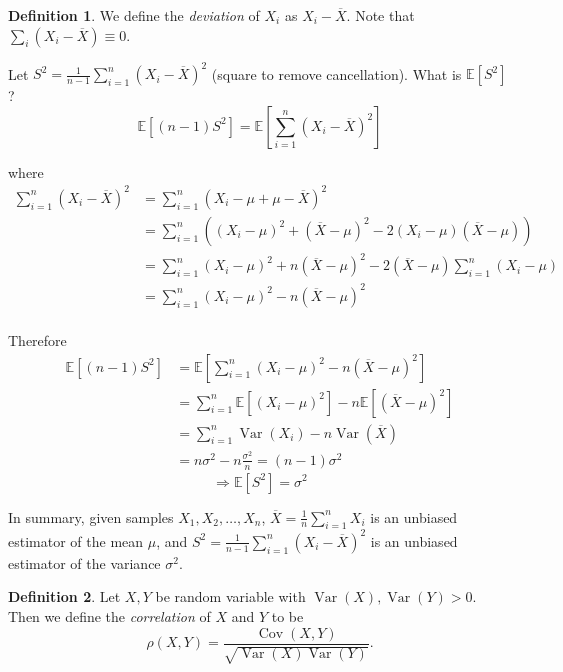 \documentclass[a4paper,11pt]{amsbook}
\theoremstyle{definition}
\newtheorem{definition}{\hspace{-2em} \color{darkblue} Definition}[chapter]
\theoremstyle{remark}
\newcommand{\E}{\mathbb{E}}
\DeclareMathOperator\Var{Var}
\DeclareMathOperator\Cov{Cov}
\newcommand\0{\varnothing}
\begin{document}
\begin{definition}
    We define the \emph{deviation} of $X_i$ as $X_i-\overline{X}.$
    Note that $\sum_i(X_i-\overline{X})\equiv0$.
\end{definition}

Let $S^2=\frac{1}{n-1}\sum_{i=1}^n(X_i-\overline{X})^2$ (square to remove cancellation).
What is $\E[S^2]$?
$$\E[(n-1)S^2]=\E\left[\sum_{i=1}^n(X_i-\overline{X})^2\right]$$

where \begin{align*}
    \sum_{i=1}^n(X_i-\overline{X})^2&=\sum_{i=1}^n(X_i-\mu+\mu-\overline{X})^2 \\
    &=\sum_{i=1}^n\left((X_i-\mu)^2+(\overline{X}-\mu)^2-2(X_i-\mu)(\overline{X}-\mu)\right) \\
    &=\sum_{i=1}^n(X_i-\mu)^2+n(\overline{X}-\mu)^2-2(\overline{X}-\mu)\sum_{i=1}^n(X_i-\mu) \\
    &=\sum_{i=1}^n(X_i-\mu)^2-n(\overline{X}-\mu)^2 \\
\end{align*}

Therefore \begin{align*}
    \E[(n-1)S^2]&=\E\left[\sum_{i=1}^n(X_i-\mu)^2-n(\overline{X}-\mu)^2\right] \\
    &=\sum_{i=1}^n\E[(X_i-\mu)^2]-n\E[(\overline{X}-\mu)^2] \tag{LoE} \\
    &=\sum_{i=1}^n\Var(X_i)-n\Var(\overline{X}) \\
    &=n\sigma^2-n\frac{\sigma^2}{n}=(n-1)\sigma^2
\end{align*}
$$\Rightarrow\E[S^2]=\sigma^2$$

In summary, given samples $X_1,X_2,\ldots,X_n$,
$\overline{X}=\frac{1}{n}\sum_{i=1}^nX_i$ is an unbiased estimator of the mean $\mu$, 
and $S^2=\frac{1}{n-1}\sum_{i=1}^n(X_i-\overline{X})^2$ is an unbiased estimator of the variance $\sigma^2$.

\begin{definition}
    Let $X,Y$ be random variable with $\Var(X),\Var(Y)>0$.
    Then we define the \emph{correlation} of $X$ and $Y$ to be
    $$\rho(X,Y)=\frac{\Cov(X,Y)}{\sqrt{\Var(X)\Var(Y)}}.$$
\end{definition}
\end{document}
